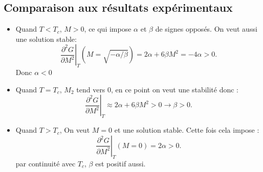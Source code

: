 \documentclass[10pt]{beamer}
\begin{document}
\subsection{Comparaison aux résultats expérimentaux}
\begin{frame}{\insertsubsection}
    \begin{itemize}
        \item Quand $T<T_c$, $M>0$, ce qui impose $\alpha$ et $\beta$ de signes opposés. On veut aussi une solution stable:
        \begin{equation}
            \left.\dfrac{\partial^2G}{\partial M^2}\right|_T(M=\sqrt{-\alpha/\beta})= 2\alpha+6\beta M^2=-4\alpha>0.
        \end{equation}
        Donc $\alpha<0$
        \item Quand $T=T_c$, $M_2$ tend vers 0, en ce point on veut une stabilité donc :
        \begin{equation}
            \left. \dfrac{\partial^2G}{\partial M^2}\right|_T\approx 2\alpha+6\beta M^2>0 \rightarrow \beta>0.
        \end{equation}
        \item Quand $T>T_c$, On veut $M=0$ et une solution stable. Cette fois cela impose :
        \begin{equation}
            \left. \dfrac{\partial^2G}{\partial M^2}\right|_T(M=0)=2\alpha>0.
        \end{equation}
        par continuité avec $T_c$, $\beta$ est positif aussi.
    \end{itemize}
\end{frame}
\end{document}
